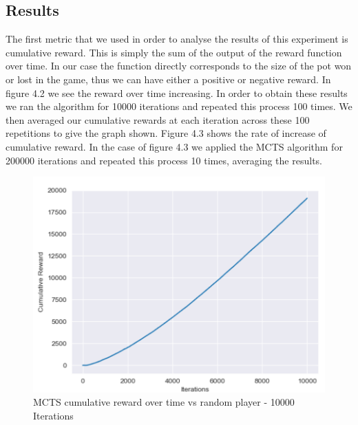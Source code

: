 \subsection{Results}\label{subsec:results1}
The first metric that we used in order to analyse the results of this experiment is cumulative reward.
This is simply the sum of the output of the reward function over time.
In our case the function directly corresponds to the size of the pot won or lost in the game,
thus we can have either a positive or negative reward.
In figure 4.2 we see the reward over time increasing.
In order to obtain these results we ran the algorithm for 10000 iterations and repeated this process 100 times.
We then averaged our cumulative rewards at each iteration across these 100 repetitions to give the graph shown.
Figure 4.3 shows the rate of increase of cumulative reward.
In the case of figure 4.3 we applied the MCTS algorithm for 200000 iterations and
repeated this process 10 times, averaging the results.

\begin{figure}[ht]
    \includegraphics[scale=.8]{images/cumulative_reward_mcts_vs_random.png}
    \caption{MCTS cumulative reward over time vs random player - 10000 Iterations}
\end{figure}


